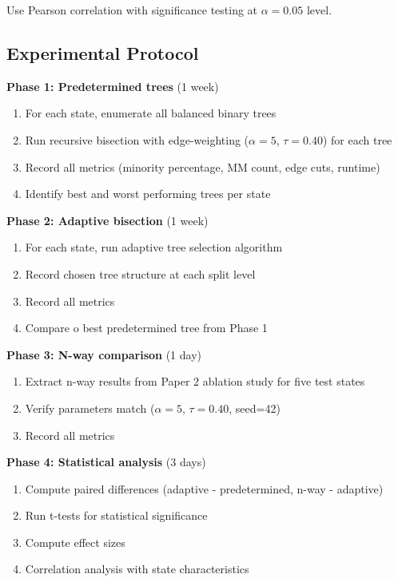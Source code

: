 Use Pearson correlation with significance testing at $\alpha = 0.05$ level.

\subsection{Experimental Protocol}

\textbf{Phase 1: Predetermined trees} (1 week)
\begin{enumerate}
\item For each state, enumerate all balanced binary trees
\item Run recursive bisection with edge-weighting ($\alpha=5$, $\tau=0.40$) for each tree
\item Record all metrics (minority percentage, MM count, edge cuts, runtime)
\item Identify best and worst performing trees per state
\end{enumerate}

\textbf{Phase 2: Adaptive bisection} (1 week)
\begin{enumerate}
\item For each state, run adaptive tree selection algorithm
\item Record chosen tree structure at each split level
\item Record all metrics
\item Compare 	o best predetermined tree from Phase 1
\end{enumerate}

\textbf{Phase 3: N-way comparison} (1 day)
\begin{enumerate}
\item Extract n-way results from Paper 2 ablation study for five test states
\item Verify parameters match ($\alpha=5$, $\tau=0.40$, seed=42)
\item Record all metrics
\end{enumerate}

\textbf{Phase 4: Statistical analysis} (3 days)
\begin{enumerate}
\item Compute paired differences (adaptive - predetermined, n-way - adaptive)
\item Run t-tests for statistical significance
\item Compute effect sizes
\item Correlation analysis with state characteristics
\end{enumerate}

